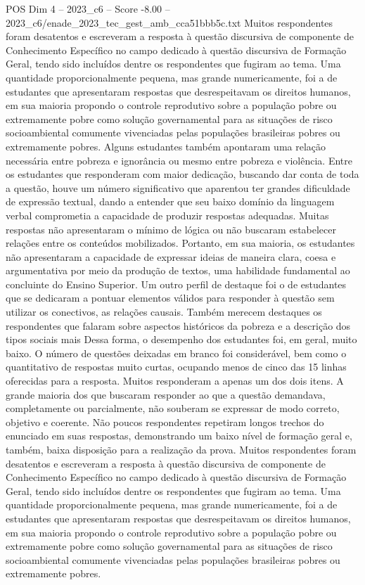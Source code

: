 \begin{textsample}{POS Dim 4 – 2023\_c6 – Score -8.00 – 2023\_c6/enade\_2023\_tec\_gest\_amb\_cca51bbb5c.txt}
Muitos respondentes foram desatentos e escreveram a resposta à questão discursiva de componente de Conhecimento Específico no campo dedicado à questão discursiva de Formação Geral, tendo sido incluídos dentre os respondentes que fugiram ao tema.
Uma quantidade proporcionalmente pequena, mas grande numericamente, foi a de estudantes que apresentaram respostas que desrespeitavam os direitos humanos, em sua maioria propondo o controle reprodutivo sobre a população pobre ou extremamente pobre como solução governamental para as situações de risco socioambiental comumente vivenciadas pelas populações brasileiras pobres ou extremamente pobres.
Alguns estudantes também apontaram uma relação necessária entre pobreza e ignorância ou mesmo entre pobreza e violência.
Entre os estudantes que responderam com maior dedicação, buscando dar conta de toda a questão, houve um número significativo que aparentou ter grandes dificuldade de expressão textual, dando a entender que seu baixo domínio da linguagem verbal comprometia a capacidade de produzir respostas adequadas.
Muitas respostas não apresentaram o mínimo de lógica ou não buscaram estabelecer relações entre os conteúdos mobilizados.
Portanto, em sua maioria, os estudantes não apresentaram a capacidade de expressar ideias de maneira clara, coesa e argumentativa por meio da produção de textos, uma habilidade fundamental ao concluinte do Ensino Superior.
Um outro perfil de destaque foi o de estudantes que se dedicaram a pontuar elementos válidos para responder à questão sem utilizar os conectivos, as relações causais.
Também merecem destaques os respondentes que falaram sobre aspectos históricos da pobreza e a descrição dos tipos sociais mais Dessa forma, o desempenho dos estudantes foi, em geral, muito baixo.
O número de questões deixadas em branco foi considerável, bem como o quantitativo de respostas muito curtas, ocupando menos de cinco das 15 linhas oferecidas para a resposta.
Muitos responderam a apenas um dos dois itens.
A grande maioria dos que buscaram responder ao que a questão demandava, completamente ou parcialmente, não souberam se expressar de modo correto, objetivo e coerente.
Não poucos respondentes repetiram longos trechos do enunciado em suas respostas, demonstrando um baixo nível de formação geral e, também, baixa disposição para a realização da prova.
Muitos respondentes foram desatentos e escreveram a resposta à questão discursiva de componente de Conhecimento Específico no campo dedicado à questão discursiva de Formação Geral, tendo sido incluídos dentre os respondentes que fugiram ao tema.
Uma quantidade proporcionalmente pequena, mas grande numericamente, foi a de estudantes que apresentaram respostas que desrespeitavam os direitos humanos, em sua maioria propondo o controle reprodutivo sobre a população pobre ou extremamente pobre como solução governamental para as situações de risco socioambiental comumente vivenciadas pelas populações brasileiras pobres ou extremamente pobres.

\end{textsample}
